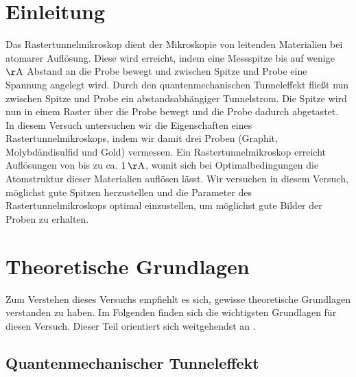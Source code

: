 \documentclass[12pt,listof=totoc]{scrartcl}
\begin{document}
\thispagestyle{empty}
\tableofcontents
\newpage

\section{Einleitung}

Das Rastertunnelmikroskop dient der Mikroskopie von leitenden Materialien bei atomarer Auflösung. Diese wird erreicht, indem eine Messspitze bis auf wenige $\mathrm{\AA}$ Abstand an die Probe bewegt und zwischen Spitze und Probe eine Spannung angelegt wird. Durch den quantenmechanischen Tunneleffekt fließt nun zwischen Spitze und Probe ein abstandsabhängiger Tunnelstrom. Die Spitze wird nun in einem Raster über die Probe bewegt und die Probe dadurch abgetastet.\\

In diesem Versuch untersuchen wir die Eigenschaften eines Rastertunnelmikroskops, indem wir damit drei Proben (Graphit, Molybdändisulfid und Gold) vermessen. Ein Rastertunnelmikroskop erreicht Auflösungen von bis zu ca. $1\,\mathrm{\AA}$, womit sich bei Optimalbedingungen die Atomstruktur dieser Materialien auflösen lässt. Wir versuchen in diesem Versuch, möglichst gute Spitzen herzustellen und die Parameter des Rastertunnelmikroskops optimal einzustellen, um möglichst gute Bilder der Proben zu erhalten.



\newpage
\section{Theoretische Grundlagen}

Zum Verstehen dieses Versuchs empfiehlt es sich, gewisse theoretische Grundlagen verstanden zu haben. Im Folgenden finden sich die wichtigsten Grundlagen für diesen Versuch. Dieser Teil orientiert sich weitgehendst an \cite{staat}.

\subsection{Quantenmechanischer Tunneleffekt}\label{tunnel}
\end{document}
